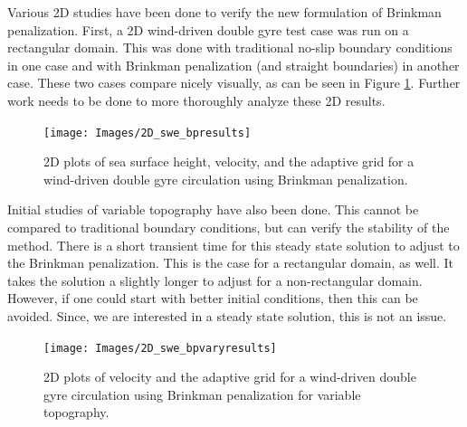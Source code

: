 Various 2D studies have been done to verify the new formulation of Brinkman penalization.  First, a 2D wind-driven double gyre test case was run on a rectangular domain.  This was done with traditional no-slip boundary conditions in one case and with Brinkman penalization (and straight boundaries) in another case.  These two cases compare nicely visually, as can be seen in Figure \ref{f:2D_swe_bpresults}.  Further work needs to be done to more thoroughly analyze these 2D results.

\begin{center}
\begin{figure}[h!]
\centering
  \texttt{[image: Images/2D\_swe\_bpresults]}
  \caption[2D wind-driven results with Brinkman]{2D plots of sea surface height, velocity, and the adaptive grid for a wind-driven double gyre circulation using Brinkman penalization.}\label{f:2D_swe_bpresults}
\end{figure}
\end{center}

Initial studies of variable topography have also been done.  This cannot be compared to traditional boundary conditions, but can verify the stability of the method. There is a short transient time for this steady state solution to adjust to the Brinkman penalization.  This is the case for a rectangular domain, as well.  It takes the solution a slightly longer to adjust for a non-rectangular domain.  However, if one could start with better initial conditions, then this can be avoided.  Since, we are interested in a steady state solution, this is not an issue.  

\begin{center}
\begin{figure}[h!]
\centering
  \texttt{[image: Images/2D\_swe\_bpvaryresults]}
  \caption[2D wind-driven results with Brinkman for variable topography]{2D plots of velocity and the adaptive grid for a wind-driven double gyre circulation using Brinkman penalization for variable topography.}\label{f:2D_swe_bpvaryresults}
\end{figure}
\end{center}

